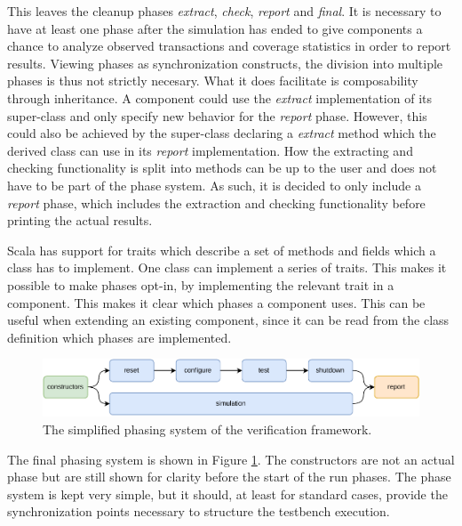 This leaves the cleanup phases \textit{extract}, \textit{check}, \textit{report} and \textit{final}. It is necessary
to have at least one phase after the simulation has ended to give components a chance to analyze observed
transactions and coverage statistics in order to report results. Viewing phases as synchronization constructs, the
division into multiple phases is thus not strictly necesary. What it does facilitate is composability through
inheritance. A component could use the \textit{extract} implementation of its super-class and only specify new
behavior for the \textit{report} phase. However, this could also be achieved by the super-class declaring a
\textit{extract} method which the derived class can use in its \textit{report} implementation. How the extracting and
checking functionality is split into methods can be up to the user and does not have to be part of the phase system.
As such, it is decided to only include a \textit{report} phase, which includes the extraction and checking
functionality before printing the actual results.

Scala has support for traits which describe a set of methods and fields which a class has to implement. One class can
implement a series of traits. This makes it possible to make phases opt-in, by implementing the relevant trait in a
component. This makes it clear which phases a component uses. This can be useful when extending an existing
component, since it can be read from the class definition which phases are implemented.

\begin{figure}
  \centering
  \includegraphics[width=\textwidth]{diagrams/own_phases.pdf}
  \caption{The simplified phasing system of the verification framework.}
  \label{fig:phases}
\end{figure}

The final phasing system is shown in Figure \ref{fig:phases}. The constructors are not an actual phase but are still
shown for clarity before the start of the run phases. The phase system is kept very simple, but it should, at least
for standard cases, provide the synchronization points necessary to structure the testbench execution.

